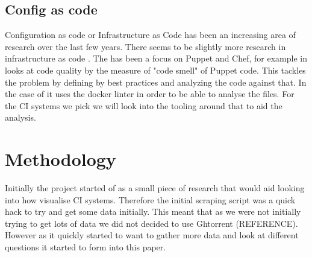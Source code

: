 \documentclass[twoside,12pt,titlepage,a4paper]{article}
\begin{document}
\vspace*{-0.05in}
\subsection{Config as code}
\vspace*{-0.05in}

Configuration as code or Infrastructure as Code has been an increasing area of research over the last few years. There seems to be slightly more research in infrastructure as code \citet{Rahman2019}. The has been a focus on Puppet and Chef, for example in \citet{Sharma2016} looks at code quality by the measure of "code smell" of Puppet code. This tackles the problem by defining by best practices and analyzing the code against that. In the case of \citet{Cito2017} it uses the docker linter in order to be able to analyse the files. 
For the CI systems we pick we will look into the tooling around that to aid the analysis.


\section{Methodology}
\label{methodology}

Initially the project started of as a small piece of research that would aid looking into how visualise CI systems. Therefore the initial scraping script was a quick hack to try and get some data initially. This meant that as we were not initially trying to get lots of data we did not decided to use Ghtorrent (REFERENCE). However as it quickly started to want to gather more data and look at different questions it started to form into this paper. 
\end{document}
